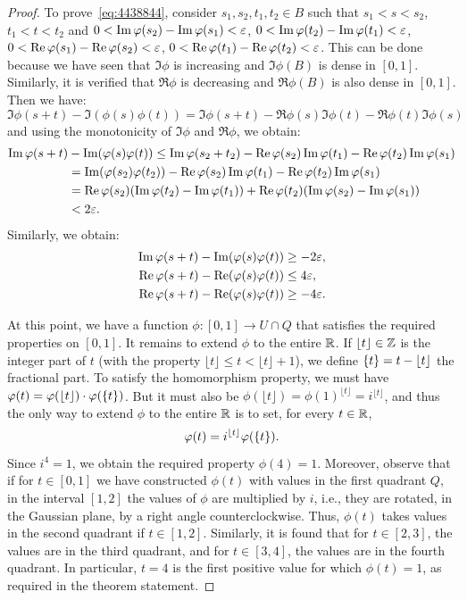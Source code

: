 \begin{proof}
To prove~\eqref{eq:4438844}, consider 
$s_1,s_2,t_1,t_2\in B$ such that $s_1<s<s_2$, 
$t_1<t<t_2$
and $0<\operatorname{Im} \varphi(s_2)-\operatorname{Im} \varphi(s_1)<\varepsilon$, $0<\operatorname{Im} \varphi(t_2)-\operatorname{Im} \varphi(t_1)<\varepsilon$,
  $0<\operatorname{Re} \varphi(s_1)-\operatorname{Re} \varphi(s_2)<\varepsilon$, $0<\operatorname{Re} \varphi(t_1)-\operatorname{Re} \varphi(t_2)<\varepsilon$.
This can be done because we have seen that $\Im  \phi$ is increasing 
and $\Im \phi(B)$ is dense in $[0,1]$.
Similarly, it is verified that $\Re \phi$ is decreasing and
$\Re \phi(B)$ is also dense in $[0,1]$.
Then we have:
\[
\Im \phi(s+t) - \Im (\phi(s)\phi(t))
= \Im \phi(s+t) - \Re \phi(s)\Im \phi(t) - \Re \phi(t)\Im \phi(s)
\]
and using the monotonicity of $\Im \phi$ and $\Re \phi$, we obtain:
\begin{align*}
\operatorname{Im} \varphi(s+t) &- \operatorname{Im} (\varphi(s)\varphi(t))
\le \operatorname{Im} \varphi(s_2+t_2) - \operatorname{Re} \varphi(s_2)\operatorname{Im} \varphi(t_1) - \operatorname{Re} \varphi(t_2)\operatorname{Im} \varphi(s_1)\\ 
&= \operatorname{Im} (\varphi(s_2)\varphi(t_2)) - \operatorname{Re} \varphi(s_2)\operatorname{Im} \varphi(t_1) - \operatorname{Re} \varphi(t_2)\operatorname{Im}
\varphi(s_1)\\
&= \operatorname{Re}\varphi(s_2)(\operatorname{Im}\varphi(t_2) - \operatorname{Im} \varphi(t_1))+\operatorname{Re}\varphi(t_2)(\operatorname{Im}\varphi(s_2) - \operatorname{Im}
\varphi(s_1))\\
&< 2\varepsilon.
\end{align*}
Similarly, we obtain:
\begin{align*}
\operatorname{Im} \varphi(s+t) - \operatorname{Im} (\varphi(s)\varphi(t))
&\ge -2\varepsilon,\\
\operatorname{Re} \varphi(s+t) - \operatorname{Re} (\varphi(s)\varphi(t))
&\le 4\varepsilon,\\
\operatorname{Re} \varphi(s+t) - \operatorname{Re} (\varphi(s)\varphi(t))
&\ge -4\varepsilon.
\end{align*}

At this point, we have a function $\phi\colon[0,1]\to U\cap Q$ 
that satisfies the required properties on $[0,1]$.
It remains to extend $\phi$ to the entire ${\mathbb R}$.
If $\lfloor t \rfloor \in {\mathbb Z}$ is the integer part of $t$ (with the property 
$\lfloor t \rfloor \le t < \lfloor t \rfloor +1$), we define ${\left\{ t \right\}} =
t-\lfloor t \rfloor $
the fractional part. 
To satisfy the homomorphism property, we must have $\varphi(t)=\varphi(\lfloor t
\rfloor )\cdot\varphi({\left\{ t \right\}})$.
But it must also be $\phi(\lfloor t \rfloor )=\phi(1)^{\lfloor t \rfloor
}=i^{\lfloor t \rfloor }$, and thus
the only way to extend $\phi$ to the entire ${\mathbb R}$ is to set,
for every $t\in {\mathbb R}$,
\[
  \varphi(t) = i^{\lfloor t \rfloor }\varphi({\left\{ t \right\}}).
\]
Since $i^4=1$, we obtain the required property $\phi(4)=1$.
Moreover, observe that if for $t\in[0,1]$ we have constructed 
$\phi(t)$ with values in the first quadrant $Q$, in the interval $[1,2]$
the values of $\phi$ are multiplied by $i$, i.e., they are 
rotated, in the Gaussian plane, by a right angle counterclockwise.
Thus, $\phi(t)$ takes values in the second quadrant if $t\in[1,2]$.
Similarly, it is found that for $t\in[2,3]$, the values are in the third 
quadrant, and for $t\in[3,4]$, the values are in the fourth quadrant.
In particular, $t=4$ is the first positive value for which 
$\phi(t)=1$, as required in the theorem statement.


\end{proof}
